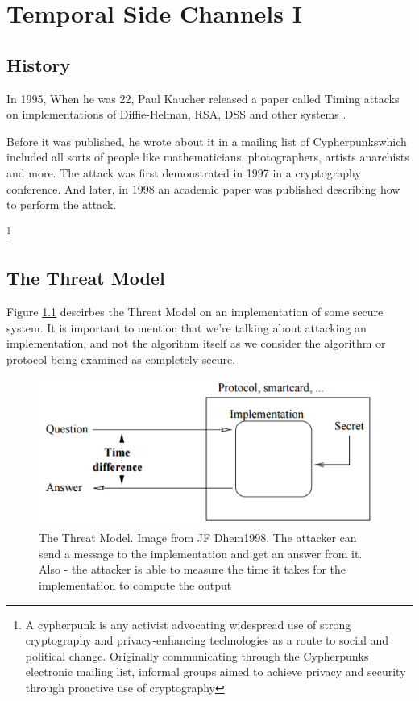 \chapter{Temporal Side Channels I} 

\section{History}
In 1995, When he was 22, Paul Kaucher released a paper called Timing attacks on implementations of Diffie-Helman, RSA, DSS and other systems \cite{kocher1996timing}.

Before it was published, he wrote about it in a mailing list of Cypherpunks\footnotemark[1] 
which included all sorts of people like mathematicians, photographers, artists anarchists and more.
The attack was first demonstrated in 1997 in a cryptography conference.
And later, in 1998 an academic paper was published describing how to perform the attack.

\footnote[1]{A cypherpunk is any activist advocating widespread use of strong cryptography and privacy-enhancing technologies as a route to social and political change. Originally communicating through the Cypherpunks electronic mailing list, informal groups aimed to achieve privacy and security through proactive use of cryptography}

\section{The Threat Model}
Figure \ref{c1_fig_threat_model} descirbes the Threat Model on an implementation of some secure system.
It is important to mention that we're talking about attacking an implementation, and not the algorithm itself as we consider the algorithm or protocol being examined as completely secure.

\begin{figure}[H]
    \centering
    \includegraphics{images/chapter_1/threat_model.png}
    \caption{The Threat Model. Image from JF Dhem1998.
     The attacker can send a message to the implementation and get an answer from it. Also - the attacker is able to measure the time it takes for the implementation to compute the output}
    \label{c1_fig_threat_model}
\end{figure}

